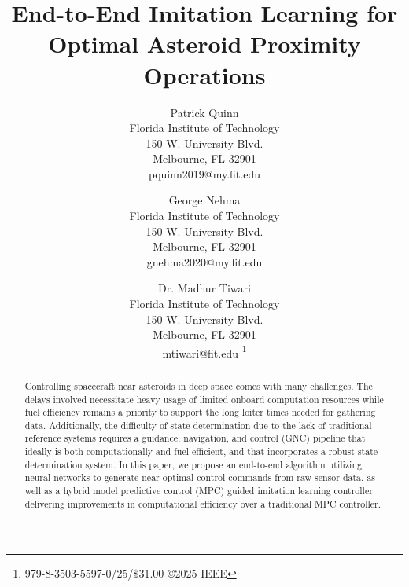\documentclass[twocolumn,letterpaper]{IEEEAerospaceCLS}
\begin{document}
\title{End-to-End Imitation Learning for Optimal Asteroid Proximity Operations}

\author{
Patrick Quinn\\ 
Florida Institute of Technology\\
150 W. University Blvd.\\
Melbourne, FL 32901\\
pquinn2019@my.fit.edu
\and 
George Nehma\\ 
Florida Institute of Technology\\
150 W. University Blvd.\\
Melbourne, FL 32901\\
gnehma2020@my.fit.edu
\and 
Dr. Madhur Tiwari\\ 
Florida Institute of Technology\\
150 W. University Blvd.\\
Melbourne, FL 32901\\
mtiwari@fit.edu
%
\thanks{\footnotesize 979-8-3503-5597-0/25/$\$31.00$ \copyright2025 IEEE}
}

        

\maketitle

\thispagestyle{plain}
\pagestyle{plain}

\maketitle

\thispagestyle{plain}
\pagestyle{plain}

\begin{abstract}
Controlling spacecraft near asteroids in deep space comes with many challenges. The delays involved necessitate heavy usage of limited onboard computation resources while fuel efficiency remains a priority to support the long loiter times needed for gathering data. Additionally, the difficulty of state determination due to the lack of traditional reference systems requires a guidance, navigation, and control (GNC) pipeline that ideally is both computationally and fuel-efficient, and that incorporates a robust state determination system. In this paper, we propose an end-to-end algorithm utilizing neural networks to generate near-optimal control commands from raw sensor data, as well as a hybrid model predictive control (MPC) guided imitation learning controller delivering improvements in computational efficiency over a traditional MPC controller.
\end{abstract} 
\end{document}
